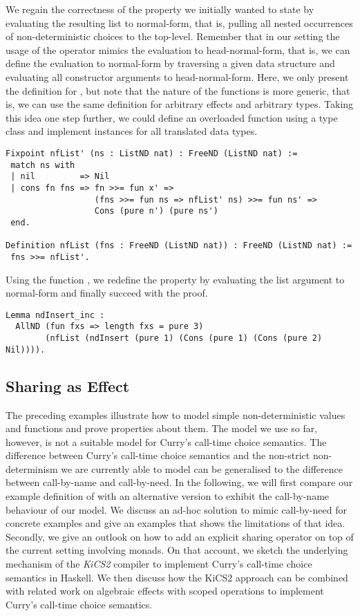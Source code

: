 We regain the correctness of the property we initially wanted to state by evaluating the resulting list to normal-form, that is, pulling all nested occurrences of non-deterministic choices to the top-level.
Remember that in our setting the usage of the operator \cinl{>>=} mimics the evaluation to head-normal-form, that is, we can define the evaluation to normal-form by traversing a given data structure and evaluating all constructor arguments to head-normal-form.
Here, we only present the definition for , but note that the nature of the functions is more generic, that is, we can use the same definition for arbitrary effects and arbitrary types.
Taking this idea one step further, we could define an overloaded function  using a type class and implement instances for all translated data types.

\begin{verbatim}
Fixpoint nfList' (ns : ListND nat) : FreeND (ListND nat) :=
 match ns with
 | nil         => Nil
 | cons fn fns => fn >>= fun x' =>
                  (fns >>= fun ns => nfList' ns) >>= fun ns' =>
                  Cons (pure n') (pure ns')
 end.

Definition nfList (fns : FreeND (ListND nat)) : FreeND (ListND nat) :=
 fns >>= nfList'.
\end{verbatim}

Using the function , we redefine the property by evaluating the list argument to normal-form and finally succeed with the proof.

\begin{verbatim}
Lemma ndInsert_inc :
  AllND (fun fxs => length fxs = pure 3)
        (nfList (ndInsert (pure 1) (Cons (pure 1) (Cons (pure 2) Nil)))).
\end{verbatim}

\subsection{Sharing as Effect}

The preceding examples illustrate how to model simple non-deterministic values and functions and prove properties about them.
The model we use so far, however, is not a suitable model for Curry's call-time choice semantics.
The difference between Curry's call-time choice semantics and the non-strict non-determinism we are currently able to model can be generalised to the difference between call-by-name and call-by-need.
In the following, we will first compare our example definition of  with an alternative version to exhibit the call-by-name behaviour of our model.
We discuss an ad-hoc solution to mimic call-by-need for concrete examples and give an examples that shows the limitations of that idea.
Secondly, we give an outlook on how to add an explicit sharing operator on top of the current setting involving  monads.
On that account, we sketch the underlying mechanism of the \emph{KiCS2} compiler to implement Curry's call-time choice semantics in Haskell.
We then discuss how the KiCS2 approach can be combined with related work on algebraic effects with scoped operations to implement Curry's call-time choice semantics.

